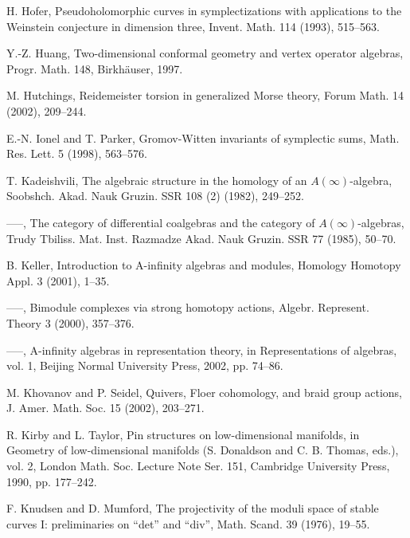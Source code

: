 \begin{list}{}{\setlength{\leftmargin}{3em}\setlength{\labelwidth}{2.5em}\setlength{\itemsep}{.5em}\small}
\item[\hypertarget{bib:76}{[76]}] H. Hofer, Pseudoholomorphic curves in symplectizations with applications to the Weinstein conjecture in dimension three, Invent. Math. 114 (1993), 515–563. 
\item[\hypertarget{bib:77}{[77]}] Y.-Z. Huang, Two-dimensional conformal geometry and vertex operator algebras, Progr. Math. 148, Birkhäuser, 1997. 
\item[\hypertarget{bib:78}{[78]}] M. Hutchings, Reidemeister torsion in generalized Morse theory, Forum Math. 14 (2002), 209–244. 
\item[\hypertarget{bib:79}{[79]}] E.-N. Ionel and T. Parker, Gromov-Witten invariants of symplectic sums, Math. Res. Lett. 5 (1998), 563–576. 
\item[\hypertarget{bib:80}{[80]}] T. Kadeishvili, The algebraic structure in the homology of an $A(\infty)$-algebra, Soobshch. Akad. Nauk Gruzin. SSR 108 (2) (1982), 249–252. 
\item[\hypertarget{bib:81}{[81]}] —–, The category of differential coalgebras and the category of $A(\infty)$-algebras, Trudy Tbiliss. Mat. Inst. Razmadze Akad. Nauk Gruzin. SSR 77 (1985), 50–70. 
\item[\hypertarget{bib:82}{[82]}] B. Keller, Introduction to A-infinity algebras and modules, Homology Homotopy Appl. 3 (2001), 1–35. 
\item[\hypertarget{bib:83}{[83]}] —–, Bimodule complexes via strong homotopy actions, Algebr. Represent. Theory 3 (2000), 357–376. 
\item[\hypertarget{bib:84}{[84]}] —–, A-infinity algebras in representation theory, in Representations of algebras, vol. 1, Beijing Normal University Press, 2002, pp. 74–86. 
\item[\hypertarget{bib:85}{[85]}] M. Khovanov and P. Seidel, Quivers, Floer cohomology, and braid group actions, J. Amer. Math. Soc. 15 (2002), 203–271. 
\item[\hypertarget{bib:86}{[86]}] R. Kirby and L. Taylor, Pin structures on low-dimensional manifolds, in Geometry of low-dimensional manifolds (S. Donaldson and C. B. Thomas, eds.), vol. 2, London Math. Soc. Lecture Note Ser. 151, Cambridge University Press, 1990, pp. 177–242. 
\item[\hypertarget{bib:87}{[87]}] F. Knudsen and D. Mumford, The projectivity of the moduli space of stable curves I: preliminaries on ``det'' and ``div'', Math. Scand. 39 (1976), 19–55. 

\end{list}
